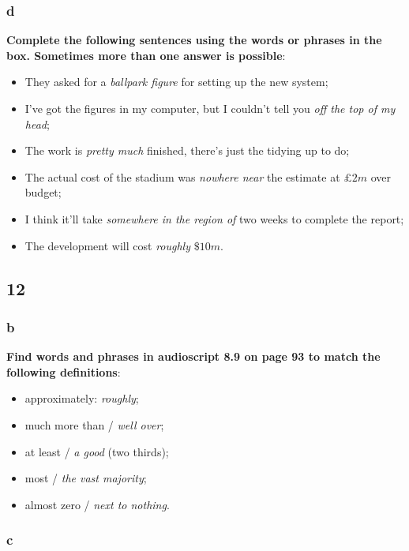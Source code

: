 \subsubsection{d}

\textbf{Complete the following sentences using the words or phrases in the box. Sometimes more than one answer is possible}:

\begin{itemize}

\item They asked for a \textit{ballpark figure} for setting up the new system;
\item I've got the figures in my computer, but I couldn't tell you \textit{off the top of my head};
\item The work is \textit{pretty much} finished, there's just the tidying up to do;
\item The actual cost of the stadium was \textit{nowhere near} the estimate at $£2m$ over budget;
\item I think it'll take \textit{somewhere in the region of} two weeks to complete the report;
\item The development will cost \textit{roughly} $\$10m$.

\end{itemize}

\subsection{12}

\subsubsection{b}

\textbf{Find words and phrases in audioscript 8.9 on page 93 to match the following definitions}:

\begin{itemize}

\item approximately: \textit{roughly};
\item much more than / \textit{well over};
\item at least / \textit{a good} (two thirds);
\item most / \textit{the vast majority};
\item almost zero / \textit{next to nothing}.

\end{itemize}

\subsubsection{c}

